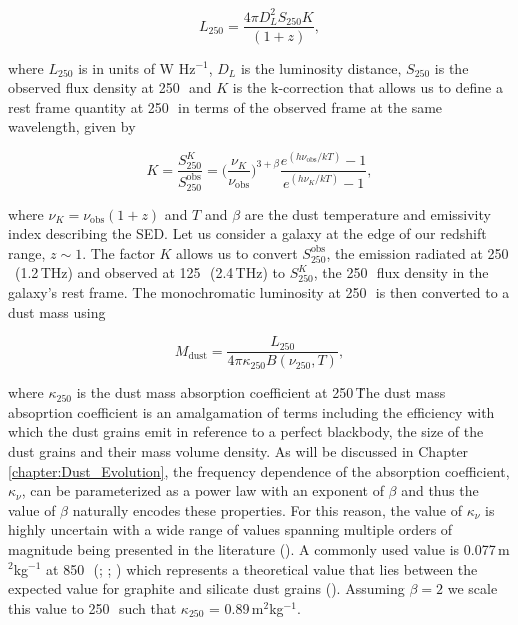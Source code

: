 \begin{equation}
    L_{250} = \frac{4\pi D_L^2 S_{250}K}{(1+z)},
\label{eq:monohromatic_luminosities}
\end{equation}

\noindent where $L_{250}$ is in units of W Hz$^{-1}$, $D_L$ is the luminosity distance, $S_{250}$ is the observed flux density at 250\,\micron\ and $K$ is the k-correction that allows us to define a rest frame quantity at 250\,\micron\ in terms of the observed frame at the same wavelength, given by

\begin{equation}
    K = \frac{S_{250}^{K}}{S_{250}^{\textrm{obs}}} = \Bigg(\frac{\nu_{K}}{\nu_{\textrm{obs}}}\Bigg)^{3+\beta}\frac{e^{(h\nu_{\textrm{obs}}/kT)} - 1}{e^{(h\nu_{K}/kT)} - 1},
\label{eq:k_correction}
\end{equation}

\noindent where $\nu_{K} = \nu_{\textrm{obs}}(1+z)$ and $T$ and $\beta$ are the dust temperature and emissivity index describing the SED. Let us consider a galaxy at the edge of our redshift range, $z \sim 1$. The factor $K$ allows us to convert $S_{250}^{\textrm{obs}}$, the emission radiated at 250\,\micron\ (1.2\,THz) and observed at 125\,\micron\ (2.4\,THz) to $S_{250}^{K}$, the 250\,\micron\ flux density in the galaxy's rest frame. The monochromatic luminosity at 250\,\micron\ is then converted to a dust mass using

\begin{equation}
    M_{\textrm{dust}} = \frac{L_{250}}{4\pi\kappa_{250}B(\nu_{250}, T)},
\label{fig:dust_mass}
\end{equation}

\noindent where $\kappa_{250}$ is the dust mass absorption coefficient at 250\,\micron\. The dust mass absoprtion coefficient is an amalgamation of terms including the efficiency with which the dust grains emit in reference to a perfect blackbody, the size of the dust grains and their mass volume density. As will be discussed in Chapter \ref{chapter:Dust_Evolution}, the frequency dependence of the absorption coefficient, $\kappa_\nu$, can be parameterized as a power law with an exponent of $\beta$ and thus the value of $\beta$ naturally encodes these properties. For this reason, the value of $\kappa_\nu$ is highly uncertain with a wide range of values spanning multiple orders of magnitude being presented in the literature (\citealt{Clark_2019}). A commonly used value is 0.077\,m$^{2}$kg$^{-1}$ at 850\,\micron\ (\citealt{Dunne_2000}; \citealt{daCunha_2008}; \citealt{Dunne_2011}) which represents a theoretical value that lies between the expected value for graphite and silicate dust grains (\citealt{Draine_1984}). Assuming $\beta = 2$ we scale this value to 250\,\micron\ such that $\kappa_{250}$ = 0.89\,m$^{2}$kg$^{-1}$.

